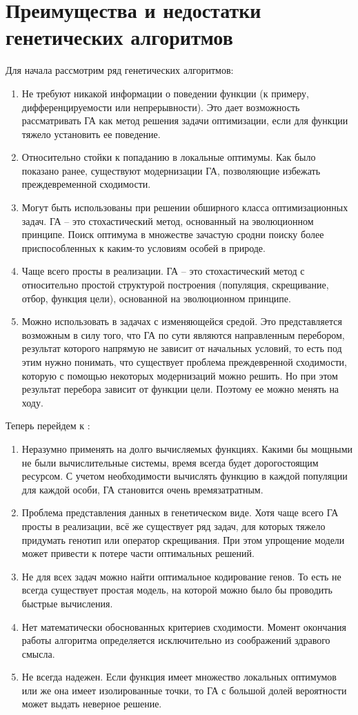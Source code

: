 \chapter{Преимущества и недостатки генетических алгоритмов}
Для начала рассмотрим ряд  генетических алгоритмов:
\begin{enumerate}
\item Не требуют никакой информации о поведении функции (к примеру, дифференцируемости или непрерывности). Это дает возможность рассматривать ГА как метод решения задачи оптимизации, если для функции тяжело установить ее поведение. 
\item Относительно стойки к попаданию в локальные оптимумы. Как было показано ранее, существуют модернизации ГА, позволяющие избежать преждевременной сходимости.
\item Могут быть использованы при решении обширного класса оптимизационных задач. ГА -- это стохастический метод, основанный на эволюционном принципе. Поиск оптимума в множестве зачастую сродни поиску более приспособленных к каким-то условиям особей в природе.
\item Чаще всего просты в реализации. ГА -- это стохастический метод с относительно простой структурой построения (популяция, скрещивание, отбор, функция цели), основанной на эволюционном принципе.
\item Можно использовать в задачах с изменяющейся средой. Это представляется возможным в силу того, что ГА по сути являются направленным перебором, результат которого напрямую не зависит от начальных условий, то есть под этим нужно понимать, что существует проблема преждевренной сходимости, которую с помощью некоторых модернизаций можно решить. Но при этом результат перебора зависит от функции цели. Поэтому ее можно менять на ходу.
\end{enumerate}
Теперь перейдем к :
\begin{enumerate}
\item Неразумно применять на долго вычисляемых функциях. Какими бы мощными не были вычислительные системы, время всегда будет дорогостоящим ресурсом. С учетом необходимости вычислять функцию в каждой популяции для каждой особи, ГА становится очень времязатратным.  
\item Проблема представления данных в генетическом виде. Хотя чаще всего ГА просты в реализации, всё же существует ряд задач, для которых тяжело придумать генотип или оператор скрещивания. При этом упрощение модели может привести к потере части оптимальных решений.
\item Не для всех задач можно найти оптимальное кодирование генов. То есть не всегда существует простая модель, на которой можно было бы проводить быстрые вычисления.
\item Нет математически обоснованных критериев сходимости. Момент окончания работы алгоритма определяется исключительно из соображений здравого смысла. 
\item Не всегда надежен. Если функция имеет множество локальных оптимумов или же она имеет изолированные точки, то ГА с большой долей вероятности может выдать неверное решение.
\end{enumerate}

